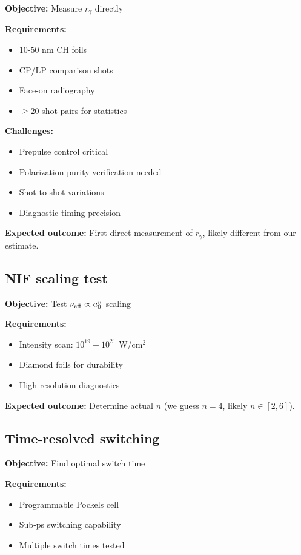 \documentclass[aps,pre,twocolumn,showpacs,superscriptaddress]{revtex4-2}
\theoremstyle{definition}
\begin{document}
\textbf{Objective:} Measure $r_\gamma$ directly

\textbf{Requirements:}
\begin{itemize}
\item 10-50 nm CH foils
\item CP/LP comparison shots
\item Face-on radiography
\item $\geq$20 shot pairs for statistics
\end{itemize}

\textbf{Challenges:}
\begin{itemize}
\item Prepulse control critical
\item Polarization purity verification needed
\item Shot-to-shot variations
\item Diagnostic timing precision
\end{itemize}

\textbf{Expected outcome:} First direct measurement of $r_\gamma$, likely different from our estimate.

\subsection{NIF scaling test}

\textbf{Objective:} Test $\nu_{\rm eff} \propto a_0^n$ scaling

\textbf{Requirements:}
\begin{itemize}
\item Intensity scan: $10^{19}-10^{21}$ W/cm$^2$
\item Diamond foils for durability
\item High-resolution diagnostics
\end{itemize}

\textbf{Expected outcome:} Determine actual $n$ (we guess $n=4$, likely $n \in [2,6]$).

\subsection{Time-resolved switching}

\textbf{Objective:} Find optimal switch time

\textbf{Requirements:}
\begin{itemize}
\item Programmable Pockels cell
\item Sub-ps switching capability
\item Multiple switch times tested
\end{itemize}
\end{document}
